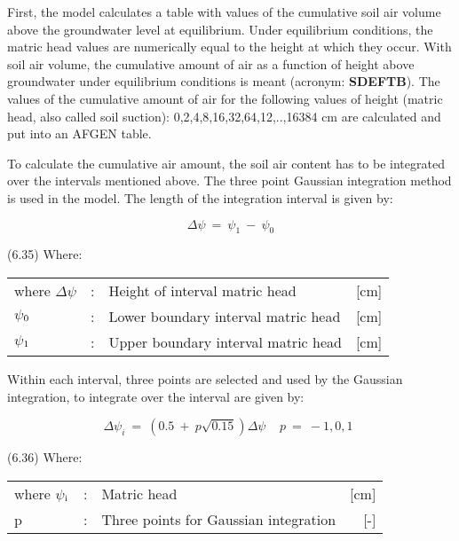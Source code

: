 First, the model calculates a table with values of the cumulative soil air volume above the
ground\-water level at equilibrium. Under equilibrium conditions, the matric head values
are numerically equal to the height at which they occur. With soil air volume, the
cumulat\-ive amount of air as a function of height above groundwater under equilibrium
conditions is meant (acronym: {\bf SDEFTB}). The values of the cumulative amount of air for
the following values of height (matric head, also called soil suction): 0,2,4,8,16,32,64,12,..,16384 cm are calculated and put into an AFGEN table. 



To calculate the cumulative air amount, the soil air content has to be integrated over the
intervals mentioned above. The three point Gaussian integration method is used in the
model. The length of the integration interval is given by:

\begin{equation}
\Delta  \psi ~=~ \psi _{1} ~-~ \psi _{0} 
\end{equation}

 
\strut\hfill (6.35)
Where:\\
\begin{tabularx}{\textwidth}{llXr}



where $\Delta$$\psi$ &:& Height of interval matric head  & [cm]\\
$\psi$$_{{\rm 0}}$ &:& Lower boundary interval matric head  & [cm]\\
$\psi$$_{{\rm 1}}$ &:& Upper boundary interval matric head  & [cm]
\end{tabularx}



Within each interval, three points are selected and used by the Gaussian integration, to
integrate over the interval are given by:

\begin{equation}
 \Delta  \psi _{i} ~=~ (0.5 ~+~ p \sqrt{0.15} ) \Delta  \psi ~~~~~p~=~-1,0,1~~
\end{equation}

 
\strut\hfill (6.36)
Where:\\
\begin{tabularx}{\textwidth}{llXr}



where $\psi$$_{{\rm i}}$ &:& Matric head   & [cm]\\
p &:& Three points for Gaussian integration  & [-]
\end{tabularx}



